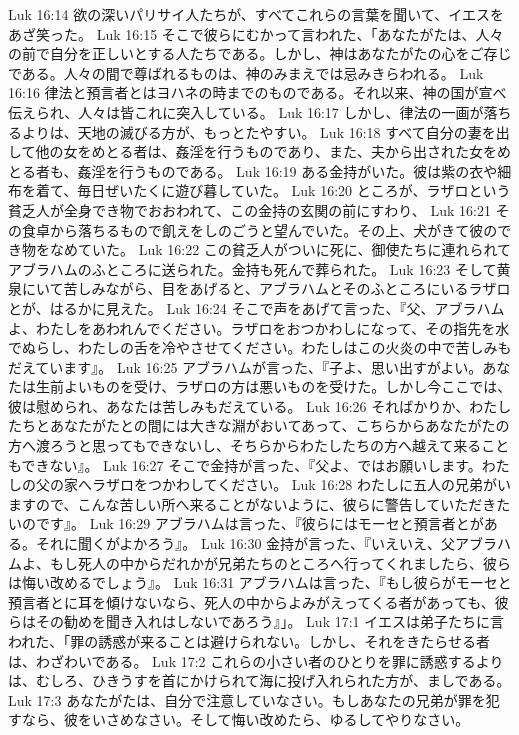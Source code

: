 Luk 16:14  欲の深いパリサイ人たちが、すべてこれらの言葉を聞いて、イエスをあざ笑った。
Luk 16:15  そこで彼らにむかって言われた、「あなたがたは、人々の前で自分を正しいとする人たちである。しかし、神はあなたがたの心をご存じである。人々の間で尊ばれるものは、神のみまえでは忌みきらわれる。
Luk 16:16  律法と預言者とはヨハネの時までのものである。それ以来、神の国が宣べ伝えられ、人々は皆これに突入している。
Luk 16:17  しかし、律法の一画が落ちるよりは、天地の滅びる方が、もっとたやすい。
Luk 16:18  すべて自分の妻を出して他の女をめとる者は、姦淫を行うものであり、また、夫から出された女をめとる者も、姦淫を行うものである。
Luk 16:19  ある金持がいた。彼は紫の衣や細布を着て、毎日ぜいたくに遊び暮していた。
Luk 16:20  ところが、ラザロという貧乏人が全身でき物でおおわれて、この金持の玄関の前にすわり、
Luk 16:21  その食卓から落ちるもので飢えをしのごうと望んでいた。その上、犬がきて彼のでき物をなめていた。
Luk 16:22  この貧乏人がついに死に、御使たちに連れられてアブラハムのふところに送られた。金持も死んで葬られた。
Luk 16:23  そして黄泉にいて苦しみながら、目をあげると、アブラハムとそのふところにいるラザロとが、はるかに見えた。
Luk 16:24  そこで声をあげて言った、『父、アブラハムよ、わたしをあわれんでください。ラザロをおつかわしになって、その指先を水でぬらし、わたしの舌を冷やさせてください。わたしはこの火炎の中で苦しみもだえています』。
Luk 16:25  アブラハムが言った、『子よ、思い出すがよい。あなたは生前よいものを受け、ラザロの方は悪いものを受けた。しかし今ここでは、彼は慰められ、あなたは苦しみもだえている。
Luk 16:26  そればかりか、わたしたちとあなたがたとの間には大きな淵がおいてあって、こちらからあなたがたの方へ渡ろうと思ってもできないし、そちらからわたしたちの方へ越えて来ることもできない』。
Luk 16:27  そこで金持が言った、『父よ、ではお願いします。わたしの父の家へラザロをつかわしてください。
Luk 16:28  わたしに五人の兄弟がいますので、こんな苦しい所へ来ることがないように、彼らに警告していただきたいのです』。
Luk 16:29  アブラハムは言った、『彼らにはモーセと預言者とがある。それに聞くがよかろう』。
Luk 16:30  金持が言った、『いえいえ、父アブラハムよ、もし死人の中からだれかが兄弟たちのところへ行ってくれましたら、彼らは悔い改めるでしょう』。
Luk 16:31  アブラハムは言った、『もし彼らがモーセと預言者とに耳を傾けないなら、死人の中からよみがえってくる者があっても、彼らはその勧めを聞き入れはしないであろう』」。
Luk 17:1  イエスは弟子たちに言われた、「罪の誘惑が来ることは避けられない。しかし、それをきたらせる者は、わざわいである。
Luk 17:2  これらの小さい者のひとりを罪に誘惑するよりは、むしろ、ひきうすを首にかけられて海に投げ入れられた方が、ましである。
Luk 17:3  あなたがたは、自分で注意していなさい。もしあなたの兄弟が罪を犯すなら、彼をいさめなさい。そして悔い改めたら、ゆるしてやりなさい。

